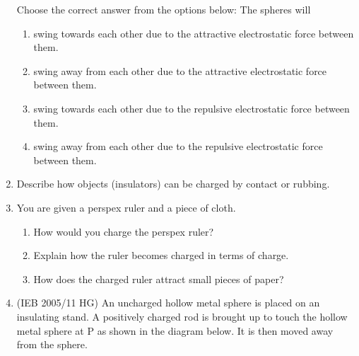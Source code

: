 \begin{enumerate}[noitemsep, label=\textbf{\arabic*}. ]
\begin{figure}[H]
\begin{center}
      \vspace{2pt}
    \vspace{.1in}
    
    \end{center}

 \end{figure}   

    \addtocounter{footnote}{-0}
    
Choose the correct answer from the options below:
The spheres will
\label{m38781*id202176}\begin{enumerate}[noitemsep, label=\textbf{\alph*}. ] 
            \label{m38781*uid28}\item swing towards each other due to the attractive electrostatic force between them.
\label{m38781*uid29}\item swing away from each other due to the attractive electrostatic force between them.
\label{m38781*uid30}\item swing towards each other due to the repulsive electrostatic force between them.
\label{m38781*uid31}\item swing away from each other due to the repulsive electrostatic force between them.
\end{enumerate}
        \newline
            \label{m38781*uid32}\item Describe how objects (insulators) can be charged by contact or rubbing.\newline
            
\label{m38781*uid33}\item You are given a perspex ruler and a piece of cloth.
\label{m38781*id202255}\begin{enumerate}[noitemsep, label=\textbf{\alph*}. ] 
            \label{m38781*uid34}\item How would you charge the perspex ruler?
\label{m38781*uid35}\item Explain how the ruler becomes charged in terms of charge.
\label{m38781*uid36}\item How does the charged ruler attract small pieces of paper?
\end{enumerate}
        \newline
            \label{m38781*uid37}\item (IEB 2005/11 HG) An uncharged hollow metal sphere is placed on an insulating stand. A positively charged rod is brought up to touch the hollow metal sphere at P as shown in the diagram below. It is then moved away from the sphere.


\end{enumerate}
